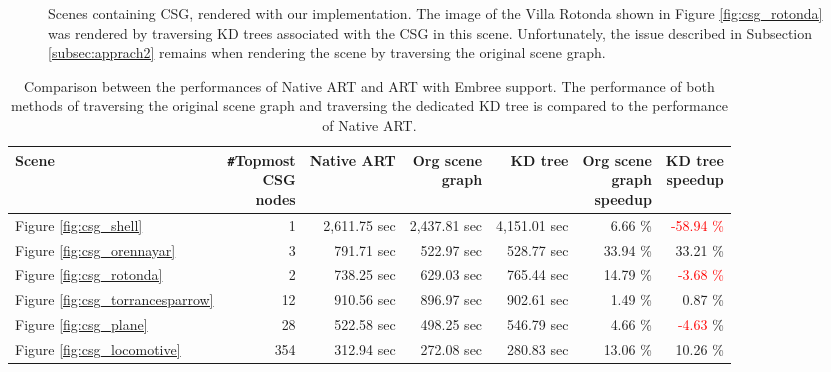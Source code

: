 \begin{figure}
	\hfill
	
	\caption{Scenes containing CSG, rendered with our implementation. The image of the Villa Rotonda shown in Figure \ref{fig:csg_rotonda} was rendered by traversing KD trees associated with the CSG in this scene. Unfortunately, the issue described in Subsection \ref{subsec:apprach2} remains when rendering the scene by traversing the original scene graph.}
	\label{fig:csg_figures}
\end{figure}

\begin{table}[h]
	\centering
	{\footnotesize\sf
		\begin{tabular}{lrrrrrr}
			\toprule
			Scene & \thead{\texttt{\#}Topmost \\ CSG \\ nodes} & Native ART & \thead{Org scene \\ graph} &  KD tree & \thead{Org scene \\ graph \\ speedup} & \thead{KD tree \\ speedup} \\ 
			\midrule
			Figure \ref{fig:csg_shell} & 1 & 2,611.75 sec & 2,437.81 sec & 4,151.01 sec & 6.66 \% & \textcolor{red}{-58.94 \%}  \\
			Figure \ref{fig:csg_orennayar} & 3 & 791.71 sec & 522.97 sec & 528.77 sec & 33.94 \% & 33.21 \% \\
			Figure \ref{fig:csg_rotonda} & 2 & 738.25 sec & 629.03 sec &  765.44 sec & 14.79 \%  & \textcolor{red}{-3.68 \%}  \\
			\addlinespace %
			Figure \ref{fig:csg_torrancesparrow} & 12 & 910.56 sec & 896.97 sec & 902.61 sec & 1.49 \%  & 0.87 \% \\
			Figure \ref{fig:csg_plane} & 28 & 522.58 sec & 498.25 sec & 546.79 sec & 4.66 \% & \textcolor{red}{-4.63} \% \\
			Figure \ref{fig:csg_locomotive} & 354 & 312.94 sec & 272.08 sec & 280.83 sec & 13.06 \%  & 10.26 \% \\
			\bottomrule
	\end{tabular}}
	\caption{Comparison between the performances of Native ART and ART with Embree support. The performance of both methods of traversing the original scene graph and traversing the dedicated KD tree is compared to the performance of Native ART.}
	\label{tab:csg}
\end{table}

